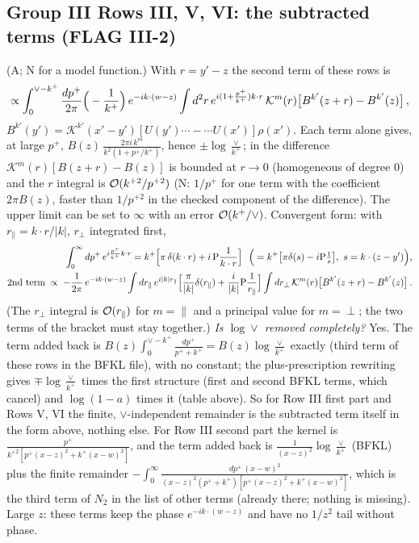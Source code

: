 \documentclass[9pt]{article}
\numberwithin{equation}{section}
\begin{document}
\subsection{Group III Rows III, V, VI: the subtracted terms (FLAG III-2)}
\noindent (A; N for a model function.) With $r=y'-z$ the second term of these rows is
\begin{align}
\propto\int_{0}^{\vee-k^{+}}\frac{dp^{+}}{2\pi}\Big(-\frac{1}{k^{+}}\Big)\,e^{-ik\cdot(w-z)}\int d^{2}r\,e^{i(1+\frac{p^{+}}{k^{+}})k\cdot r}\,\mathcal K^{m}(r)\big[B^{k'}(z+r)-B^{k'}(z)\big]\,,\notag
\end{align}
$B^{k'}(y')=\mathcal K^{k'}(x'-y')[U(y')\cdots-\cdots U(x')]\rho(x')$. Each term alone gives, at large $p^{+}$, $B(z)\,\frac{2\pi i\,k^{m}}{k^{2}(1+p^{+}/k^{+})}$, hence $\pm\log\frac{\vee}{k^{+}}$; in the difference $\mathcal K^{m}(r)[B(z+r)-B(z)]$ is bounded at $r\to0$ (homogeneous of degree $0$) and the $r$ integral is ${\cal O}(k^{+2}/p^{+2})$ (N: $1/p^{+}$ for one term with the coefficient $2\pi B(z)$, faster than $1/p^{+2}$ in the checked component of the difference). The upper limit can be set to $\infty$ with an error ${\cal O}(k^{+}/\vee)$. Convergent form: with $r_{\parallel}=k\cdot r/|k|$, $r_{\perp}$ integrated first,
\begin{align}
\int_{0}^{\infty}dp^{+}\,e^{i\frac{p^{+}}{k^{+}}k\cdot r}=k^{+}\Big[\pi\,\delta(k\cdot r)+i\,{\rm P}\frac{1}{k\cdot r}\Big]\ \ \Big(=k^{+}\big[\pi\delta(s)-i{\rm P}\tfrac1s\big],\ s=k\cdot(z-y')\Big),\notag\\
\text{2nd term}\;\propto\;-\frac{1}{2\pi}\,e^{-ik\cdot(w-z)}\int dr_{\parallel}\,e^{i|k|r_{\parallel}}\Big[\frac{\pi}{|k|}\delta(r_{\parallel})+\frac{i}{|k|}{\rm P}\frac{1}{r_{\parallel}}\Big]\int dr_{\perp}\,\mathcal K^{m}(r)\big[B^{k'}(z+r)-B^{k'}(z)\big]\,.\notag
\end{align}
(The $r_{\perp}$ integral is ${\cal O}(r_{\parallel})$ for $m=\parallel$ and a principal value for $m=\perp$; the two terms of the bracket must stay together.) \emph{Is $\log\vee$ removed completely?} Yes. The term added back is $B(z)\int_{0}^{\vee-k^{+}}\frac{dp^{+}}{p^{+}+k^{+}}=B(z)\log\frac{\vee}{k^{+}}$ exactly (third term of these rows in the BFKL file), with no constant; the plus-prescription rewriting gives $\mp\log\frac{\vee}{k^{+}}$ times the first structure (first and second BFKL terms, which cancel) and $\log(1-a)$ times it (table above). So for Row III first part and Rows V, VI the finite, $\vee$-independent remainder is the subtracted term itself in the form above, nothing else. For Row III second part the kernel is $\frac{p^{+}}{k^{+2}[p^{+}(x-z)^{2}+k^{+}(x-w)^{2}]}$, and the term added back is $\frac{1}{(x-z)^{2}}\log\frac{\vee}{k^{+}}$ (BFKL) plus the finite remainder $-\int_{0}^{\infty}\frac{dp^{+}\,(x-w)^{2}}{(x-z)^{2}(p^{+}+k^{+})[p^{+}(x-z)^{2}+k^{+}(x-w)^{2}]}$, which is the third term of $N_{2}$ in the list of other terms (already there; nothing is missing). Large $z$: these terms keep the phase $e^{-ik\cdot(w-z)}$ and have no $1/z^{2}$ tail without phase.
\end{document}
